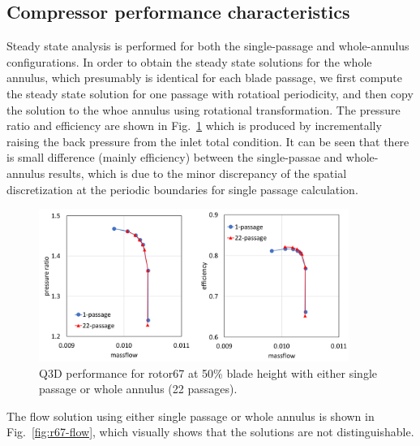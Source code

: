 \documentclass[journal,final]{new-aiaa}
\begin{document}
\subsection{Compressor performance characteristics}
Steady state analysis is performed for both
the single-passage and whole-annulus
configurations. In order to obtain the steady state
solutions for the whole annulus, which presumably
is identical for each blade passage, we first compute
the steady state solution for one passage with
rotatioal periodicity, and then copy the solution
to the whoe annulus using rotational transformation.
The pressure ratio and efficiency are shown in Fig.~\ref{fig:r67-performance}
which is produced by incrementally raising the back pressure
from the inlet total condition. It can be seen that there is small
difference (mainly efficiency) between the single-passae and
whole-annulus results, which is due to the minor discrepancy
of the spatial discretization at the periodic boundaries for single
passage calculation.

\begin{figure}[htb]
	\centering   
	\includegraphics[width=0.9\textwidth]{pic/rotor67-performance.png}
	\caption{Q3D performance for rotor67 at 50\% blade height with either
		single passage or whole annulus (22 passages).}
	\label{fig:r67-performance}
\end{figure}

The flow solution using either single passage or whole annulus
is shown in Fig.~\ref{fig:r67-flow}, which visually shows that
the solutions are not distinguishable.
\end{document}
